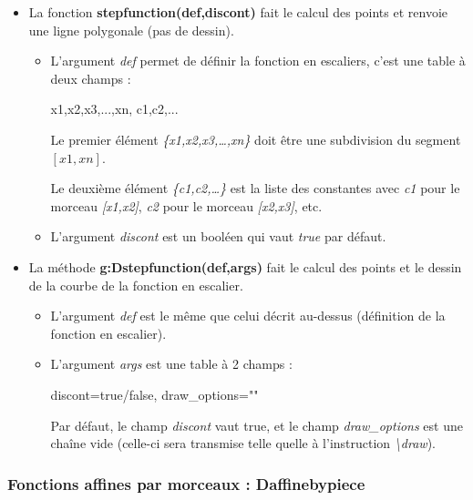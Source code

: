 \begin{itemize}
\item La fonction \textbf{stepfunction(def,discont)} fait le calcul des points et renvoie une ligne polygonale (pas de dessin).

  \begin{itemize}
  \item  L'argument \emph{def} permet de définir la fonction en escaliers, c'est une table à deux champs :

\begin{TeXcode}
  { {x1,x2,x3,...,xn}, {c1,c2,...} }
\end{TeXcode}

  Le premier élément \emph{\{x1,x2,x3,\ldots,xn\}} doit être une subdivision du segment \([x1,xn]\).
  
  Le deuxième élément \emph{\{c1,c2,\ldots\}} est la liste des constantes avec \emph{c1} pour le morceau \emph{{[}x1,x2{]}}, \emph{c2} pour le morceau \emph{{[}x2,x3{]}}, etc.
  
  \item   L'argument \emph{discont} est un booléen qui vaut \emph{true} par défaut.
  \end{itemize}
  
\item La méthode \textbf{g:Dstepfunction(def,args)} fait le calcul des points et le dessin de la courbe de la fonction en escalier.

  \begin{itemize}
  \item L'argument \emph{def} est le même que celui décrit au-dessus (définition de la fonction en escalier).
  \item L'argument \emph{args} est une table à 2 champs : 
  
\begin{TeXcode}
  { discont=true/false, draw_options="" }
\end{TeXcode}

  Par défaut, le champ \emph{discont} vaut true, et le champ \emph{draw\_options} est une chaîne vide (celle-ci sera transmise telle quelle à l'instruction \emph{\textbackslash draw}).
  \end{itemize}
\end{itemize}

\subsubsection{Fonctions affines par morceaux : Daffinebypiece}

